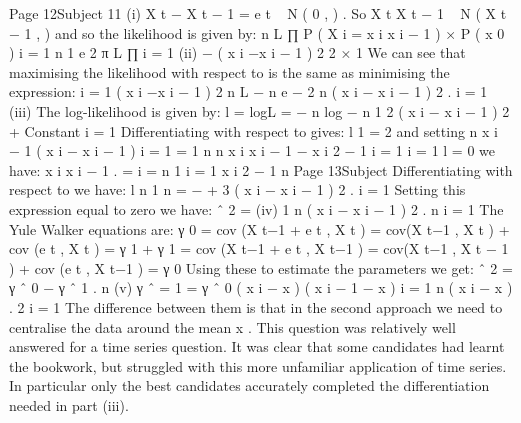 \documentclass[a4paper,12pt]{article}
\begin{document}
Page 12Subject %
11
(i)
X t − \alpha X t − 1 = e t ~ N ( 0 ,  ) .
So X t X t − 1 ~ N ( \alpha X t − 1 ,  )
and so the likelihood is given by:
n
L \propto  ∏ P ( X i = x i x i − 1 ) × P ( x 0 )
i = 1
n
1
e
2 π\sigma
L \propto  ∏
i = 1
(ii)
−
( x i −\alpha x i − 1 ) 2
2 
× 1
We can see that maximising the likelihood with respect to \alpha is the same as
minimising the expression:
\sum  i = 1 ( x i −\alpha x i − 1 ) 2
n
L \propto  \sigma − n e
−
2 
n
\sum  ( x i − \alpha x i − 1 ) 2 .
i = 1
(iii)
The log-likelihood is given by:
l = logL = − n log \sigma −
n
1
2 
\sum  ( x i − \alpha x i − 1 ) 2 + Constant
i = 1
Differentiating with respect to \alpha gives:
\partial  l
1
= 2
\partial {} \sigma
and setting
n
 x i − 1 ( x i − \alpha x i − 1 )
i = 1
=
1
n
\alpha
n
\sum  x i x i − 1 −  \sum  x i 2 − 1
i = 1
i = 1
\partial  l
= 0 we have:
\partial \alpha
\sum  x i x i − 1 .
\hat{\alpha} = i = n 1
\sum  i = 1 x i 2 − 1
n
Page 13Subject %
Differentiating with respect to \sigma we have:
\partial  l
n 1 n
= − + 3 \sum  ( x i − \alpha x i − 1 ) 2 .
\partial \sigma
\sigma \sigma i = 1
Setting this expression equal to zero we have:
\sigma ˆ 2 =
(iv)
1 n
( x i − \hat{\alpha} x i − 1 ) 2 .
\sum 
n i = 1
The Yule Walker equations are:
γ 0 = cov (\alpha X t−1 + e t , X t ) = \alpha cov(X t−1 , X t ) + cov (e t , X t ) = \alpha γ 1 + 
γ 1 = cov (\alpha X t−1 + e t , X t−1 ) = \alpha cov(X t−1 , X t − 1 ) + cov (e t , X t−1 ) = \alpha γ 0
Using these to estimate the parameters we get:
\sigma ˆ 2 = γ ˆ 0 − \hat{\alpha} γ ˆ 1 .
n
(v)
γ ˆ
\hat{\alpha} = 1 =
γ ˆ 0
\sum  ( x i − x ) ( x i − 1 − x )
i = 1
n
\sum  ( x i − x )
.
2
i = 1
The difference between them is that in the second approach we need to
centralise the data around the mean x .
This question was relatively well answered for a time series question. It was clear that some
candidates had learnt the bookwork, but struggled with this more unfamiliar application of
time series. In particular only the best candidates accurately completed the differentiation
needed in part (iii).
\end{document}
